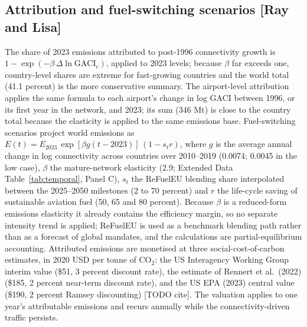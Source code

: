 \documentclass[12pt]{article}
\begin{document}
\subsection*{Attribution and fuel-switching scenarios [Ray and Lisa]}
The share of 2023 emissions attributed to post-1996 connectivity growth is
$1 - \exp(-\beta\,\Delta \ln \mathrm{GACI}_c)$, applied to 2023 levels;
because $\beta$ far exceeds one, country-level shares are extreme for
fast-growing countries and the world total (41.1 percent) is the more
conservative summary. The airport-level attribution applies the same
formula to each airport's change in log GACI between 1996, or its first
year in the network, and 2023; its sum (346 Mt) is close to the country
total because the elasticity is applied to the same emissions base. Fuel-switching scenarios project world emissions as
$E(t) = E_{2023}\,\exp[\beta g (t-2023)]\,(1 - s_t r)$, where $g$ is the
average annual change in log connectivity across countries over
2010--2019 (0.0074; 0.0045 in the low case), $\beta$ the mature-network
elasticity (2.9; Extended Data Table~\ref{tab:temporal}, Panel C), $s_t$
the ReFuelEU blending share interpolated between the 2025--2050 milestones
(2 to 70 percent) and $r$ the life-cycle saving of sustainable aviation
fuel (50, 65 and 80 percent). Because $\beta$ is a reduced-form emissions
elasticity it already contains the efficiency margin, so no separate
intensity trend is applied; ReFuelEU is used as a benchmark blending path
rather than as a forecast of global mandates, and the calculations are
partial-equilibrium accounting. Attributed emissions are monetised at three
social-cost-of-carbon estimates, in 2020 USD per tonne of CO$_2$: the US
Interagency Working Group interim value (\$51, 3 percent discount rate),
the estimate of Rennert et al.\ (2022) (\$185, 2 percent near-term
discount rate), and the US EPA (2023) central value (\$190, 2 percent
Ramsey discounting) [TODO cite]. The valuation applies to one year's
attributable emissions and recurs annually while the connectivity-driven
traffic persists.

\end{document}
